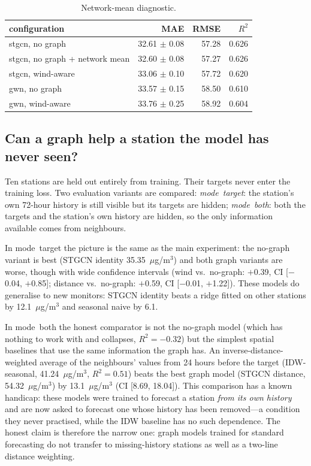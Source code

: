 \documentclass[11pt,a4paper]{article}
\begin{document}
\begin{table}[htbp]
\centering
\caption{Network-mean diagnostic.}
\label{tab:netmean}
\begin{tabular}{lrrr}
\toprule
configuration & MAE & RMSE & $R^2$ \\
\midrule
stgcn, no graph                  & 32.61 $\pm$ 0.08 & 57.28 & 0.626 \\
stgcn, no graph + network mean   & 32.60 $\pm$ 0.08 & 57.27 & 0.626 \\
stgcn, wind-aware                & 33.06 $\pm$ 0.10 & 57.72 & 0.620 \\
gwn, no graph                    & 33.57 $\pm$ 0.15 & 58.50 & 0.610 \\
gwn, wind-aware                  & 33.76 $\pm$ 0.25 & 58.92 & 0.604 \\
\bottomrule
\end{tabular}
\end{table}

\subsection{Can a graph help a station the model has never seen?}

Ten stations are held out entirely from training.  Their targets never enter
the training loss.  Two evaluation variants are compared:
\emph{mode~target}: the station's own 72-hour history is still visible but its
targets are hidden; \emph{mode~both}: both the targets and the station's own
history are hidden, so the only information available comes from neighbours.

In mode~target the picture is the same as the main experiment: the no-graph
variant is best (STGCN identity 35.35~$\mu$g/m$^3$) and both graph variants
are worse, though with wide confidence intervals (wind vs.\ no-graph:
$+$0.39, CI [$-$0.04, $+$0.85]; distance vs.\ no-graph: $+$0.59,
CI [$-$0.01, $+$1.22]).  These models do generalise to new monitors:
STGCN identity beats a ridge fitted on other stations by 12.1~$\mu$g/m$^3$
and seasonal naive by 6.1.

In mode~both the honest comparator is not the no-graph model (which has
nothing to work with and collapses, $R^2=-0.32$) but the simplest spatial
baselines that use the same information the graph has.  An
inverse-distance-weighted average of the neighbours' values from 24 hours
before the target (IDW-seasonal, 41.24~$\mu$g/m$^3$, $R^2=0.51$) beats the
best graph model (STGCN distance, 54.32~$\mu$g/m$^3$) by 13.1~$\mu$g/m$^3$
(CI [8.69, 18.04]).  This comparison has a known handicap: these models were
trained to forecast a station \emph{from its own history} and are now asked to
forecast one whose history has been removed---a condition they never practised,
while the IDW baseline has no such dependence.  The honest claim is therefore
the narrow one: graph models trained for standard forecasting do not transfer
to missing-history stations as well as a two-line distance weighting.
\end{document}
